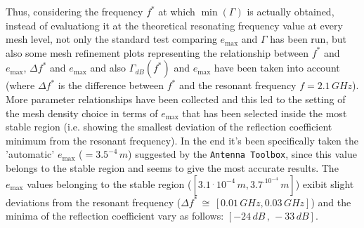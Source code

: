 \documentclass[12pt,a4paper]{article}
\begin{document}
{	Thus, considering the frequency $f^*$ at which $\min(\Gamma)$ is actually obtained, instead of evaluationg it at the theoretical resonating frequency value at every mesh level, not only the standard test comparing $e_{\max}$ and $\Gamma$ has been run, but also some mesh refinement plots representing the relationship between $f^*$ and $e_{\max}$, $\Delta f^*$ and $e_{\max}$ and also $\Gamma_{dB}(f^*)$ and $e_{\max}$ have been taken into account (where $\Delta f^*$ is the difference between $f^*$ and the resonant frequency $f=2.1\,GHz$). More parameter relationships have been collected and this led to the setting of the mesh density choice in terms of $e_{\max}$ that has been selected inside the most stable region (i.e. showing the smallest deviation of the reflection coefficient minimum from the resonant frequency). In the end it's been specifically taken the 'automatic' $e_{\max}$ ($=3.5^{-4}\,m$) suggested by the \texttt{\color{Mahogany}Antenna Toolbox}, since this value  belongs to the stable region and seems to give the most accurate results. The $e_{\max}$ values belonging to the stable region ($[3.1\,^.\,10^{-4}\,m,3.7^.10^{-4}\,m]$) exibit slight deviations from the resonant frequency ($\Delta f^*\,\cong\,[0.01\,GHz,0.03\,GHz]$) and the minima of the reflection coefficient vary as follows: $[-24\,dB\,,\,-33\,dB]$. 
	\begin{figure}[h]
		\begin{center}
			

\end{center}
\end{figure}}
\end{document}
